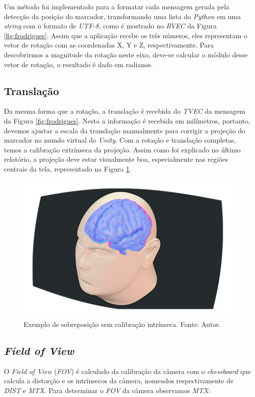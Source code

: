 Um método foi implementado para a formatar cada mensagem gerada pela detecção da posição do marcador, transformando uma lista do \textit{Python} em uma \textit{string} com o formato de \textit{UTF-8}, como é mostrado no \textit{RVEC} da Figura \ref{fig:frodrigues}. Assim que a aplicação recebe os três números, eles representam o vetor de rotação com as coordenadas X, Y e Z, respectivamente. Para descobrirmos a magnitude da rotação neste eixo, deve-se calcular o módulo desse vetor de rotação, o resultado é dado em radianos.

\subsection{Translação}

Da mesma forma que a rotação, a translação é recebida do \textit{TVEC} da mensagem da Figura \ref{fig:frodrigues}. Nesta a informação é recebida em milímetros, portanto, devemos ajustar a escala da translação manualmente para corrigir a projeção do marcador no mundo virtual do \textit{Unity}. Com a rotação e translação completas, temos a calibração extrínseca da projeção. Assim como foi explicado no último relatório, a projeção deve estar visualmente boa, especialmente nas regiões centrais da tela, representado na Figura \ref{fig:Extrinsecos}.

\begin{figure}[ht]
    \centering
    \includegraphics[width=.45\linewidth]{figuras/CalibExtr.png}
    \caption{Exemplo de sobreposição sem calibração intrínseca. Fonte: Autor.}
    \label{fig:Extrinsecos}
\end{figure}

\subsection{\textit{Field of View}}

O \textit{Field of View} (\textit{FOV}) é calculado da calibração da câmera com o \textit{chessboard} que calcula a distorção e os intrínsecos da câmera, nomeados respectivamente de \textit{DIST} e \textit{MTX}. Para determinar o \textit{FOV} da câmera observamos \textit{MTX}:

